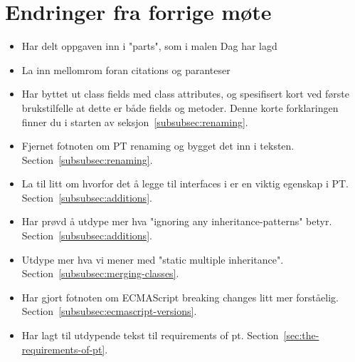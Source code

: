 
\chapter*{Endringer fra forrige møte}

\begin{itemize}
    \item Har delt oppgaven inn i "parts", som i malen Dag har lagd
    \item La inn mellomrom foran citations og paranteser
    \item Har byttet ut class fields med class attributes, og spesifisert kort ved første brukstilfelle at dette er både fields og metoder.
    Denne korte forklaringen finner du i starten av seksjon~\vref{subsubsec:renaming}.
    \item Fjernet fotnoten om PT renaming og bygget det inn i teksten.
    Section~\vref{subsubsec:renaming}.
    \item La til litt om hvorfor det å legge til interfaces i  er en viktig egenskap i PT.
    Section~\vref{subsubsec:additions}.
    \item Har prøvd å utdype mer hva "ignoring any inheritance-patterns" betyr.
    Section~\vref{subsubsec:additions}.
    \item Utdype mer hva vi mener med "static multiple inheritance".
    Section~\vref{subsubsec:merging-classes}.
    \item Har gjort fotnoten om ECMAScript breaking changes litt mer forståelig.
    Section~\vref{subsubsec:ecmascript-versions}.
    \item Har lagt til utdypende tekst til requirements of pt.
    Section~\vref{sec:the-requirements-of-pt}.
\end{itemize}

